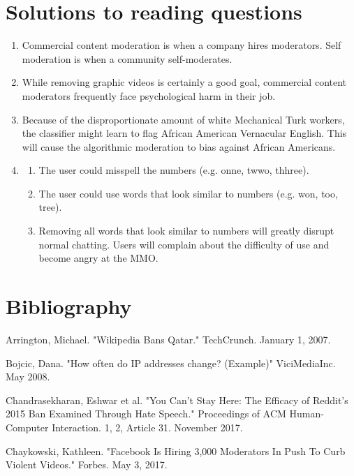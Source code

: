 \documentclass[class=book, crop=false]{standalone}
\begin{document}
\section{Solutions to reading questions}
\begin{enumerate}
    \item Commercial content moderation is when a company hires moderators. Self moderation is when a community self-moderates.
    
    \item While removing graphic videos is certainly a good goal, commercial content moderators frequently face psychological harm in their job.
    
    \item Because of the disproportionate amount of white Mechanical Turk workers, the classifier might learn to flag African American Vernacular English. This will cause the algorithmic moderation to bias against African Americans.
    
    \item \begin{enumerate}
        \item The user could misspell the numbers (e.g. onne, twwo, thhree).
        \item The user could use words that look similar to numbers (e.g. won, too, tree).
        \item Removing all words that look similar to numbers will greatly disrupt normal chatting. Users will complain about the difficulty of use and become angry at the MMO.
    \end{enumerate}
\end{enumerate}

\section{Bibliography}

Arrington, Michael. "Wikipedia Bans Qatar." TechCrunch. January 1, 2007.

Bojcic, Dana. "How often do IP addresses change? (Example)" ViciMediaInc. May 2008.

Chandrasekharan, Eshwar et al. "You Can't Stay Here: The Efficacy of Reddit's 2015 Ban Examined Through Hate Speech." Proceedings of ACM Human-Computer Interaction. 1, 2, Article 31. November 2017.

Chaykowski, Kathleen. "Facebook Is Hiring 3,000 Moderators In Push To Curb Violent Videos." Forbes. May 3, 2017.
\end{document}

